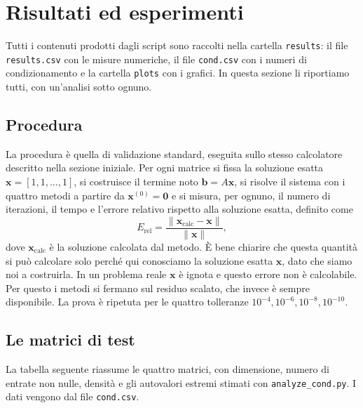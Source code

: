 \documentclass[11pt,a4paper]{article}
\begin{document}
\section{Risultati ed esperimenti}\label{sec:risultati}
Tutti i contenuti prodotti dagli script sono raccolti nella cartella
\texttt{results}: il file \texttt{results.csv} con le misure numeriche, il file
\texttt{cond.csv} con i numeri di condizionamento e la cartella \texttt{plots}
con i grafici. In questa sezione li riportiamo tutti, con un'analisi sotto ognuno.

\subsection{Procedura}
La procedura è quella di validazione standard, eseguita sullo stesso calcolatore
descritto nella sezione iniziale. Per ogni matrice si fissa la
soluzione esatta $\mathbf{x}=[1,1,\dots,1]$, si costruisce il termine noto
$\mathbf{b}=A\mathbf{x}$, si risolve il sistema con i quattro metodi a partire da
$\mathbf{x}^{(0)}=\mathbf{0}$ e si misura, per ognuno, il numero di iterazioni,
il tempo e l'errore relativo rispetto alla soluzione esatta, definito come
\[
E_{\mathrm{rel}}=\frac{\|\mathbf{x}_{\text{calc}}-\mathbf{x}\|}{\|\mathbf{x}\|},
\]
dove $\mathbf{x}_{\text{calc}}$ è la soluzione calcolata dal metodo. È bene
chiarire che questa quantità si può calcolare solo perché qui conosciamo la
soluzione esatta $\mathbf{x}$, dato che siamo noi a costruirla. In un problema
reale $\mathbf{x}$ è ignota e questo errore non è calcolabile. Per questo i metodi si fermano sul residuo
scalato, che invece è sempre disponibile. La
prova è ripetuta per le quattro tolleranze $10^{-4},10^{-6},10^{-8},10^{-10}$.

\subsection{Le matrici di test}
La tabella seguente riassume le quattro matrici, con dimensione,
numero di entrate non nulle, densità e gli autovalori estremi stimati con
\texttt{analyze\_cond.py}. I dati vengono dal file \texttt{cond.csv}.
\end{document}
